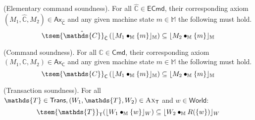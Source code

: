 \thm (Elementary command soundness). For all $\hat{\mathds{C}} \in \mathsf{ECmd}$, their corresponding axiom $(M_1, \hat{\mathds{C}}, M_2) \in \mathsf{Ax}_{\hat{\mathsf{C}}}$ and any given machine state $m \in \mathbb{M}$ the following must hold.
\[
	\tsem{\hat{\mathds{C}}}_{\hat{\mathsf{C}}} \left( \lfloor M_1 \bullet_\mathbb{M} \{m\} \rfloor_\mathbb{M} \right) \subseteq \lfloor M_2 \bullet_\mathbb{M} \{m\} \rfloor_\mathbb{M}
\]

\thm \label{thm:cSound} (Command soundness). For all $\mathds{C} \in \mathsf{Cmd}$, their corresponding axiom $(M_1, \mathds{C}, M_2) \in \mathsf{Ax}_\mathsf{C}$ and any given machine state $m \in \mathbb{M}$ the following must hold.
\[
	\tsem{\mathds{C}}_\mathsf{C} \left( \lfloor M_1 \bullet_\mathbb{M} \{m\} \rfloor_\mathbb{M} \right) \subseteq \lfloor M_2 \bullet_\mathbb{M} \{m\} \rfloor_\mathbb{M}
\]

\thm (Transaction soundness). For all $\mathds{T} \in \mathsf{Trans}, (W_1, \mathds{T}, W_2) \in \textsc{Ax}_\mathsf{T}$ and $w \in \mathsf{World}$:
\[
	\tsem{\mathds{T}}_\mathsf{T}(\lfloor W_1 \bullet_\mathbb{M} \{ w \} \rfloor_W) \subseteq \lfloor W_2 \bullet_\mathbb{M} R(\{ w \}) \rfloor_W
\]

